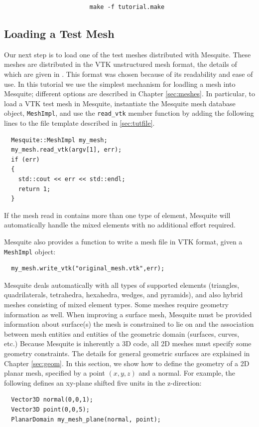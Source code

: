 \begin{verbatim}
                        make -f tutorial.make
\end{verbatim}


\subsection{Loading a Test Mesh}
\label{sec:tutMesh}
Our next step is to load one of the test meshes distributed with
Mesquite.  These meshes are distributed in the VTK unstructured mesh
format, the details of which are given in \cite{VTKbook, VTKuml}. This
format was chosen because of its readability and ease of use.
In this tutorial we use
the simplest mechanism for loadling a mesh into Mesquite; different
options are described in Chapter \ref{sec:meshes}.  In particular, to
load a VTK test mesh in Mesquite, instantiate the Mesquite mesh
database object,
\texttt{MeshImpl}, and use the \texttt{read\_vtk} member function by
adding the following lines to the file template described in
\ref{sec:tutfile}.
\begin{verbatim}
  Mesquite::MeshImpl my_mesh;
  my_mesh.read_vtk(argv[1], err);
  if (err)
  {
    std::cout << err << std::endl;
    return 1;
  }
\end{verbatim}

If the mesh read in contains more than one type of element, Mesquite will automatically
handle the mixed elements with no additional effort required.

Mesquite also provides a function to write a mesh
file in VTK format, given a \texttt{MeshImpl} object:
\begin{verbatim}
  my_mesh.write_vtk("original_mesh.vtk",err);
\end{verbatim}

Mesquite deals automatically with all types of supported elements
(triangles, quadrilaterals, tetrahedra, hexahedra, wedges, and pyramids),
and also hybrid meshes consisting of mixed element types.
Some meshes require geometry information as well.  When improving a surface mesh, Mesquite must be provided information
about surface(s) the mesh is constrained to lie on and the association between
mesh entities and entities of the geometric domain (surfaces, curves, etc.)
Because Mesquite is inherently a 3D code, all 2D meshes must specify some
geometry constraints.  The details
for general geometric surfaces are explained in Chapter
\ref{sec:geom}. In this section,
we show how to define the geometry of a 2D planar mesh, specified by a
point $(x,y,z)$ and a normal. For example, the following defines an xy-plane
shifted five units in the z-direction:
\begin{verbatim}
  Vector3D normal(0,0,1);
  Vector3D point(0,0,5);
  PlanarDomain my_mesh_plane(normal, point);
\end{verbatim}


